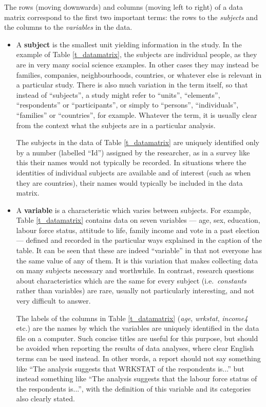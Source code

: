 The rows (moving downwards) and columns (moving left to right) of a data
matrix correspond to the first two important terms: the rows
to the \emph{subjects} and the columns to the \emph{variables} in the
data.
\begin{itemize}
\item
A \textbf{subject} is the smallest unit yielding information in the
study. In the example of Table \ref{t_datamatrix}, the subjects are
individual people, as they are in very many
social science examples. In other cases they may instead be families,
companies, neighbourhoods, countries, or whatever else is relevant in a
particular study. There is also much variation in the term itself, so
that instead of ``subjects'', a study might refer to ``units'',
``elements'', ``respondents'' or ``participants'', or simply to
``persons'', ``individuals'', ``families'' or ``countries'', for
example. Whatever the term, it is usually clear from the context what
the subjects are in a particular analysis.

The subjects in the data of Table \ref{t_datamatrix} are uniquely
identified only by a number (labelled ``Id'') assigned by the
researcher, as in a survey like this their names would not
typically be recorded. In situations where the identities of individual
subjects are available and of interest (such as when they are countries),
their names would typically be included in the data matrix.
\item
A \textbf{variable} is a characteristic which varies between subjects. For
example, Table \ref{t_datamatrix} contains data on seven variables ---
age, sex, education, labour force status, attitude to life,
family income and vote in a past election --- defined and recorded in the
particular ways explained in the caption of the table. It can be seen
that these are indeed ``variable'' in that not everyone has the same
value of any of them. It is this variation that makes collecting data on
many subjects necessary and worthwhile. In contrast, research questions
about characteristics which are the same for every subject (i.e.\
\emph{constants} rather than variables) are rare, usually not
particularly interesting, and not very difficult to answer.

The labels of the columns in Table \ref{t_datamatrix} (\emph{age},
\emph{wrkstat}, \emph{income4} etc.) are the names by which the
variables are uniquely identified in the data file on a computer. Such
concise titles are useful for this
purpose, but should be avoided when reporting the results of data
analyses, where clear English terms can be used instead. In other words,
a report should not say something like ``The analysis suggests that
WRKSTAT of the respondents is...'' but instead something like ``The
analysis suggests that the labour force status of the respondents
is...'', with the definition of this variable and its categories
also clearly stated.
\end{itemize}

